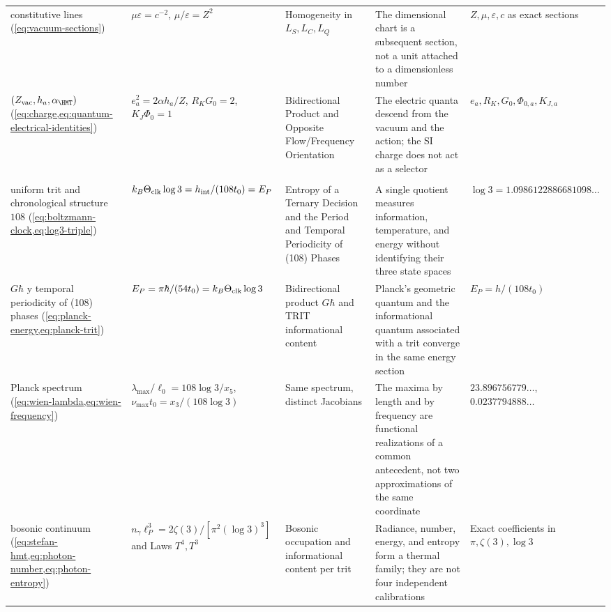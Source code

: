 \begin{longtable}{@{}
>{\raggedright\arraybackslash}p{25mm}
>{\raggedright\arraybackslash}p{37mm}
>{\raggedright\arraybackslash}p{24mm}
>{\raggedright\arraybackslash}p{29mm}
>{\raggedright\arraybackslash}p{32mm}@{}}
constitutive lines
(\cref{eq:vacuum-sections}) &
\(\mu\varepsilon=c^{-2}\), \(\mu/\varepsilon=Z^2\) &
Homogeneity in \(L_S,L_C,L_Q\) &
The dimensional chart is a subsequent section, not a unit attached to a
dimensionless number &
\(Z,\mu,\varepsilon,c\) as exact sections\\

\((Z_{\rm vac},h_a,\alpha_{\HMT})\)
(\cref{eq:charge,eq:quantum-electrical-identities}) &
\(e_a^2=2\alpha h_a/Z\), \(R_KG_0=2\), \(K_J\Phi_0=1\) &
Bidirectional Product and Opposite Flow/Frequency Orientation &
The electric quanta descend from the vacuum and the action; the SI charge does not
act as a selector &
\(e_a,R_K,G_0,\Phi_{0,a},K_{J,a}\)\\

\addlinespace
\multicolumn{5}{@{}l}{\bfseries III. Information, temperature, and radiation}\\*
uniform trit and chronological structure \(108\)
(\cref{eq:boltzmann-clock,eq:log3-triple}) &
\(k_B\Theta_{\rm clk}\log3=h_{\rm int}/(108t_0)=E_P\) &
Entropy of a Ternary Decision and the Period and Temporal Periodicity of (108) Phases &
A single quotient measures information, temperature, and energy without identifying
their three state spaces &
\(\log3=1.0986122886681098\ldots\)\\

\(G\hbar\) y temporal periodicity of (108) phases
(\cref{eq:planck-energy,eq:planck-trit}) &
\(E_P=\pi\hbar/(54t_0)=k_B\Theta_{\rm clk}\log3\) &
Bidirectional product \(G\hbar\) and TRIT informational content &
Planck's geometric quantum and the informational quantum associated with a trit
converge in the same energy section &
\(E_P=h/(108t_0)\)\\

Planck spectrum
(\cref{eq:wien-lambda,eq:wien-frequency}) &
\(\lambda_{\max}/\ell_0=108\log3/x_5\),
\(\nu_{\max}t_0=x_3/(108\log3)\) &
Same spectrum, distinct Jacobians &
The maxima by length and by frequency are functional realizations of a common antecedent, not two
approximations of the same coordinate &
\(23.896756779\ldots\), \(0.0237794888\ldots\)\\

bosonic continuum
(\cref{eq:stefan-hmt,eq:photon-number,eq:photon-entropy}) &
\(n_\gamma\ell_P^3=2\zeta(3)/[\pi^2(\log3)^3]\) and Laws \(T^4,T^3\) &
Bosonic occupation and informational content per trit &
Radiance, number, energy, and
entropy form a thermal family; they are not four
independent calibrations &
Exact coefficients in \(\pi,\zeta(3),\log3\)\\


\end{longtable}
